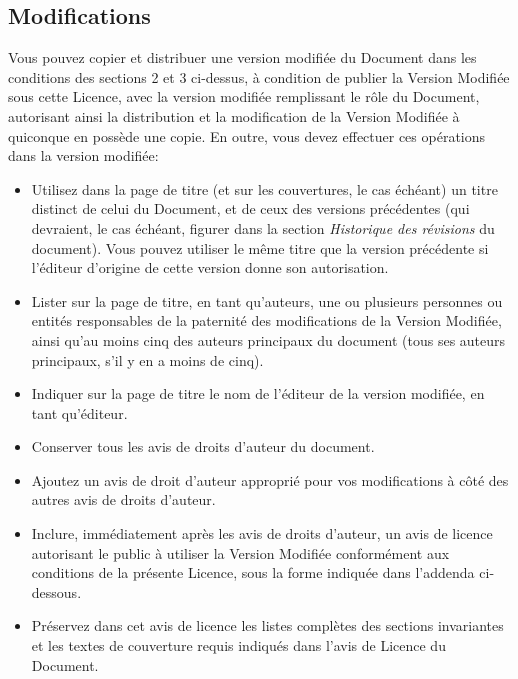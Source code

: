 	\subsection{Modifications}
	Vous pouvez copier et distribuer une version modifi\'ee du Document dans les conditions des sections 2 et 3 ci-dessus, à condition de publier la Version Modifi\'ee sous cette Licence, avec la version modifi\'ee remplissant le rôle du Document, autorisant ainsi la distribution et la modification de la Version Modifi\'ee à quiconque en possède une copie. En outre, vous devez effectuer ces op\'erations dans la version modifi\'ee:
	
	\begin{itemize}
		\item Utilisez dans la page de titre (et sur les couvertures, le cas \'ech\'eant) un titre distinct de celui du Document, et de ceux des versions pr\'ec\'edentes (qui devraient, le cas \'ech\'eant, figurer dans la section \textit{Historique des révisions} du document). Vous pouvez utiliser le même titre que la version pr\'ec\'edente si l'\'editeur d'origine de cette version donne son autorisation.

		\item Lister sur la page de titre, en tant qu'auteurs, une ou plusieurs personnes ou entit\'es responsables de la paternit\'e des modifications de la Version Modifi\'ee, ainsi qu'au moins cinq des auteurs principaux du document (tous ses auteurs principaux, s'il y en a moins de cinq).

		\item Indiquer sur la page de titre le nom de l'\'editeur de la version modifi\'ee, en tant qu'\'editeur.

		\item Conserver tous les avis de droits d'auteur du document.

		\item Ajoutez un avis de droit d'auteur appropri\'e pour vos modifications à côt\'e des autres avis de droits d'auteur. 

		\item Inclure, imm\'ediatement après les avis de droits d'auteur, un avis de licence autorisant le public à utiliser la Version Modifi\'ee conform\'ement aux conditions de la pr\'esente Licence, sous la forme indiqu\'ee dans l'addenda ci-dessous.

		\item Pr\'eservez dans cet avis de licence les listes complètes des sections invariantes et les textes de couverture requis indiqu\'es dans l'avis de Licence du Document.


\end{itemize}
